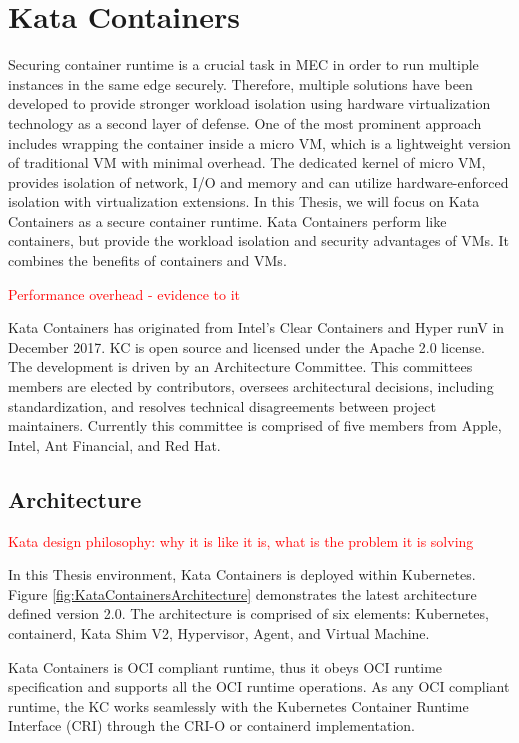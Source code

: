 \chapter{Kata Containers}
\label{chapter:katacontainers}

Securing container runtime is a crucial task in MEC in order to run multiple instances in the same edge securely. Therefore, multiple solutions have been developed to provide stronger workload isolation using hardware virtualization technology as a second layer of defense. One of the most prominent approach includes wrapping the container inside a micro VM, which is a lightweight version of traditional VM with minimal overhead. The dedicated kernel of micro VM, provides isolation of network, I/O and memory and can utilize hardware-enforced isolation with virtualization extensions. In this Thesis, we will focus on Kata Containers as a secure container runtime. Kata Containers perform like containers, but provide the workload isolation and security advantages of VMs. It combines the benefits of containers and VMs. \cite{KataContainers}

\textcolor{red}{Performance overhead - evidence to it}

Kata Containers has originated from Intel's Clear Containers \cite{ClearContainers} and Hyper runV \cite{runV} in December 2017. KC is open source and licensed under the Apache 2.0 license. The development is driven by an Architecture Committee. This committees members are elected by contributors, oversees architectural decisions, including standardization, and resolves technical disagreements between project maintainers. Currently this committee is comprised of five members from Apple, Intel, Ant Financial, and Red Hat. \cite{KataContainers}\cite{KataContainersGovernance} 

\section{Architecture}
\textcolor{red}{Kata design philosophy: why it is like it is, what is the problem it is solving}

In this Thesis environment, Kata Containers is deployed within Kubernetes. Figure \ref{fig:KataContainersArchitecture} demonstrates the latest architecture defined version 2.0. The architecture is comprised of six elements: Kubernetes, containerd, Kata Shim V2, Hypervisor, Agent, and Virtual Machine.

Kata Containers is OCI compliant runtime, thus it obeys OCI runtime specification and supports all the OCI runtime operations. As any OCI compliant runtime, the KC works seamlessly with the Kubernetes Container Runtime Interface (CRI)\cite{CRI} through the CRI-O or containerd implementation.

